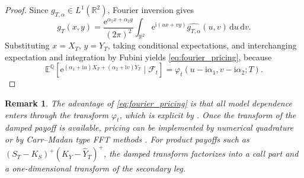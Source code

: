 \documentclass[10pt,a4paper,reqno]{amsart}
\newtheorem{remark}[theorem]{Remark}
\newcommand{\R}{\mathbb{R}}
\newcommand{\E}{\mathbb{E}}
\newcommand{\Q}{\mathbb{Q}}
\newcommand{\F}{\mathcal{F}}
\newcommand{\1}{\mathbbm{1}}
\newcommand{\dd}{\mathrm{d}}
\newcommand{\ii}{\mathrm{i}}
\newcommand{\ee}{\mathrm{e}}
\begin{document}
\begin{proof}
Since $g_{T,\alpha} \in L^1(\R^2)$, Fourier inversion gives
$$
g_T(x,y)
= \frac{\ee^{\alpha_1 x+\alpha_2 y}}{(2\pi)^2}
   \int_{\R^2}
      \ee^{\ii(ux+vy)} \widehat{g_{T,\alpha}}(u,v)\,\dd u\,\dd v.
$$
Substituting $x=X_T$, $y=Y_T$, taking conditional expectations, and
interchanging expectation and integration by Fubini yields
\eqref{eq:fourier_pricing}, because
$$
\E^\Q\!\left[
  \ee^{(\alpha_1+\ii u)X_T + (\alpha_2+\ii v)Y_T}
  \mid \F_t
\right]
= \varphi_t(u-\ii\alpha_1,v-\ii\alpha_2;T).
$$
\end{proof}

\begin{remark}
The advantage of \eqref{eq:fourier_pricing} is that all model dependence enters
through the transform $\varphi_t$, which is explicit by
. Once the transform of the damped payoff is available,
pricing can be implemented by numerical quadrature or by Carr--Madan type FFT
methods \citep{Car99}. For product payoffs such as
$(S_T-K_S)^+(K_Y-\widehat{Y}_T)^+$, the damped transform factorizes into a call part and
a one-dimensional transform of the secondary leg.
\end{remark}
\end{document}
